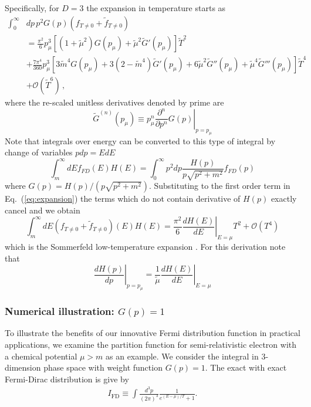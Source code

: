 \documentclass[sn-mathphys,Numbered]{sn-jnl}
\newcommand{\wt}[1]{\widetilde{#1}}
\newcommand{\req}[1]{Eq.~(\ref{#1})}
\begin{document}
Specifically, for $D=3$ the expansion in temperature starts as
\begin{equation}\label{eq:Sommerfeld_expansion}
    \begin{split}
    \int_0^\infty &dp\, p^2 G(p) (f_{T\neq 0} + \widetilde{f}_{T\neq 0})\\
    &= \frac{\pi^2}{6} p_\mu^3\left[(1 + \wt{\mu}^2)G(p_{\mu}) + \wt{\mu}^2  \wt{G}'(p_{\mu})\right] \wt{T}^2 \\
    &+ \frac{7\pi^4}{360}p_\mu^3\left[3\wt{m}^4 G(p_{\mu}) + 3(2-\wt{m}^4)\wt{G}'(p_{\mu})+ 6\wt{\mu}^2 \wt{G}''(p_{\mu}) + \wt{\mu}^4 \wt{G}'''(p_{\mu})\right]\wt{T}^4\\
    &+ \mathcal{O}(\wt{T}^6)\,,
    \end{split}
\end{equation}
where the re-scaled unitless derivatives denoted by prime are 
\begin{equation}
    \wt{G}^{(n)}(p_\mu) \equiv p_\mu^n \left.\frac{\partial^{n}}{\partial p^{n}} G(p)\right|_{p = p_\mu}
\end{equation}
Note that integrals over energy can be converted to this type of integral by change of variables $p dp = E dE$
\begin{equation}
    \int_m^\infty dE f_{FD}(E) H(E) = \int_0^\infty p^2 dp \frac{H(p)}{p\sqrt{p^2 + m^2}}f_{FD}(p) 
\end{equation}
where $G(p) = H(p)/(p\sqrt{p^2+m^2})$. Substituting to the first order term in \req{eq:expansion} the terms which do not contain derivative of $H(p)$ exactly cancel and we obtain
\begin{equation}
    \int_m^\infty dE (f_{T\neq 0}+\widetilde{f}_{T\neq 0})(E)H(E) = \frac{\pi^2}{6} \left.\frac{dH(E)}{dE}\right|_{E=\mu} T^2 + \mathcal{O}(T^4)
\end{equation}
which is the Sommerfeld low-temperature expansion \cite{landau2013statistical}. For this derivation note that
\begin{equation}
    \left. \frac{dH(p)}{dp}\right|_{p=p_\mu} = \left.\frac{1}{\wt{\mu}}\frac{dH(E)}{dE}\right|_{E=\mu}
\end{equation}



\subsubsection{Numerical illustration: $G(p)=1$}
To illustrate the benefits of our innovative Fermi distribution function in practical applications, we examine the partition function for semi-relativistic electron with a chemical potential $\mu>m$ as an example. We consider the integral in $3$-dimension phase space with weight function $G(p)=1$. The exact with exact Fermi-Dirac distribution is give by
\begin{align}\label{lnZ_Exact}
I_{\mathrm{FD}}\equiv\int\frac{d^3p}{(2\pi)^3}\frac{1}{e^{(E-\mu)/T}+1}.
\end{align}
\end{document}
